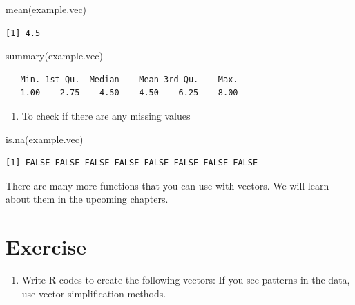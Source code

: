 \documentclass[
  letterpaper,
  DIV=11,
  numbers=noendperiod]{scrreprt}
\newenvironment{Shaded}{\begin{snugshade}}{\end{snugshade}}
\newcommand{\FunctionTok}[1]{\textcolor[rgb]{0.28,0.35,0.67}{#1}}
\newcommand{\NormalTok}[1]{\textcolor[rgb]{0.00,0.23,0.31}{#1}}
\providecommand{\tightlist}{%
  \setlength{\itemsep}{0pt}\setlength{\parskip}{0pt}}\usepackage{longtable,booktabs,array}
\begin{document}
\begin{Shaded}
\begin{Highlighting}[]
\FunctionTok{mean}\NormalTok{(example.vec)}
\end{Highlighting}
\end{Shaded}

\begin{verbatim}
[1] 4.5
\end{verbatim}

\begin{Shaded}
\begin{Highlighting}[]
\FunctionTok{summary}\NormalTok{(example.vec)}
\end{Highlighting}
\end{Shaded}

\begin{verbatim}
   Min. 1st Qu.  Median    Mean 3rd Qu.    Max. 
   1.00    2.75    4.50    4.50    6.25    8.00 
\end{verbatim}

\begin{enumerate}
\def\labelenumi{\arabic{enumi}.}
\setcounter{enumi}{4}
\tightlist
\item
  To check if there are any missing values
\end{enumerate}

\begin{Shaded}
\begin{Highlighting}[]
\FunctionTok{is.na}\NormalTok{(example.vec)}
\end{Highlighting}
\end{Shaded}

\begin{verbatim}
[1] FALSE FALSE FALSE FALSE FALSE FALSE FALSE FALSE
\end{verbatim}

There are many more functions that you can use with vectors. We will
learn about them in the upcoming chapters.

\hypertarget{exercise-1}{%
\section{Exercise}\label{exercise-1}}

\begin{enumerate}
\def\labelenumi{\arabic{enumi}.}
\tightlist
\item
  Write R codes to create the following vectors: If you see patterns in
  the data, use vector simplification methods.
\end{enumerate}
\end{document}
